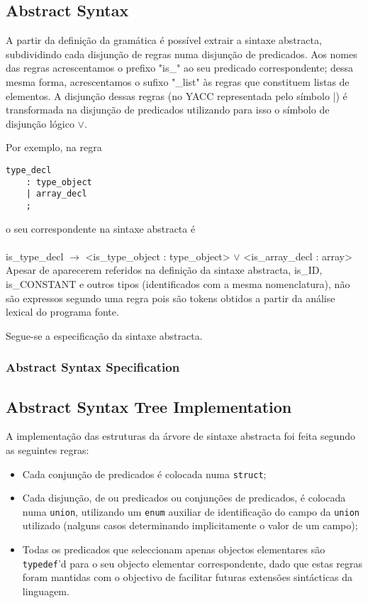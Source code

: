 \documentclass[a4paper]{article}
\begin{document}
\subsection{Abstract Syntax}
\indent \indent A partir da definição da gramática é possível extrair a sintaxe abstracta, subdividindo cada disjunção de regras numa disjunção de predicados.
Aos nomes das regras acrescentamos o prefixo "is\_" ao seu predicado correspondente;
dessa mesma forma, acrescentamos o sufixo "\_list" às regras que constituem listas de elementos.
A disjunção dessas regras (no YACC representada pelo símbolo |) é transformada na disjunção de predicados utilizando para isso
o símbolo de disjunção lógico $\vee$.

\indent Por exemplo, na regra
\begin{verbatim}
type_decl
	: type_object
	| array_decl
	;
\end{verbatim}

o seu correspondente na sintaxe abstracta é \\ \\
is\_type\_decl $\to$ <is\_type\_object : type\_object> $\vee$ <is\_array\_decl : array> \\

\indent \indent Apesar de aparecerem referidos na definição da sintaxe abstracta, is\_ID, \\
is\_CONSTANT e outros tipos (identificados com a mesma nomenclatura),
não são expressos segundo uma regra pois são tokens obtidos a partir da análise lexical do programa fonte.

Segue-se a especificação da sintaxe abstracta.

\cleardoublepage

\subsubsection{Abstract Syntax Specification}


\cleardoublepage

\subsection{Abstract Syntax Tree Implementation}
A implementação das estruturas da árvore de sintaxe abstracta foi feita segundo as seguintes regras:
\begin{itemize}
	\item Cada conjunção de predicados é colocada numa \texttt{struct};
	\item Cada disjunção, de ou predicados ou conjunções de predicados, é colocada numa \texttt{union},
		utilizando um \texttt{enum} auxiliar de identificação do campo da \texttt{union} utilizado
		(nalguns casos determinando implicitamente o valor de um campo);
	\item Todas os predicados que seleccionam apenas objectos elementares são \texttt{typedef}'d para o seu objecto elementar correspondente,
		dado que estas regras foram mantidas com o objectivo de facilitar futuras extensões sintácticas da linguagem.
\end{itemize}
\end{document}
